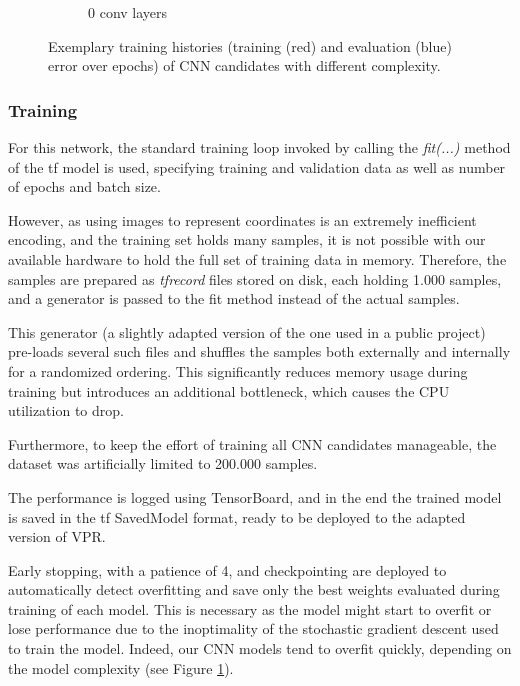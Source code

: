 \begin{figure}[H]
\begin{subfigure}[b]{0.3\linewidth}
		\caption{0 conv layers}
	\end{subfigure}
	\caption{Exemplary training histories (training (red) and evaluation (blue) error over epochs) of \gls{CNN} candidates with different complexity.}
	\label{fig:cnn-train}
\end{figure}

\subsubsection{Training}

For this network, the standard training loop invoked by calling the \textit{fit(...)} method of the \gls{tf} model is used, specifying training and validation data as well as number of epochs and batch size.

However, as using images to represent coordinates is an extremely inefficient encoding, and the training set holds many samples, it is not possible with our available hardware to hold the full set of training data in memory. Therefore, the samples are prepared as \textit{tfrecord} files stored on disk, each holding 1.000 samples, and a generator is passed to the fit method instead of the actual samples.

This generator (a slightly adapted version of the one used in a public project\cite{tfrecord-project-web}) pre-loads several such files and shuffles the samples both externally and internally for a randomized ordering. This significantly reduces memory usage during training but introduces an additional bottleneck, which causes the CPU utilization to drop.

Furthermore, to keep the effort of training all \gls{CNN} candidates manageable, the dataset was artificially limited to 200.000 samples.

The performance is logged using TensorBoard\cite{tensorboard-web}, and in the end the trained model is saved in the \gls{tf} SavedModel format\cite{savedmodel-web}, ready to be deployed to the adapted version of \gls{VPR}.

Early stopping, with a patience of 4, and checkpointing are deployed to automatically detect overfitting and save only the best weights evaluated during training of each model. This is necessary as the model might start to overfit or lose performance due to the inoptimality of the stochastic gradient descent used to train the model. Indeed, our \gls{CNN} models tend to overfit quickly, depending on the model complexity (see Figure \ref{fig:cnn-train}). 

